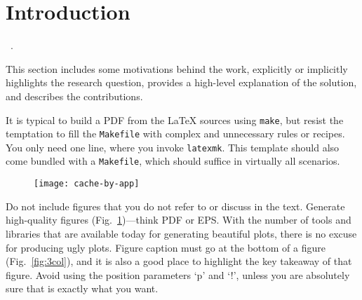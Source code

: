 \section{Introduction}\label{s:intro}

~\cite{Heiser-WebArticle2022}.


This section includes some motivations behind the work, explicitly or implicitly
highlights the research question, provides a high-level explanation of the
solution, and describes the contributions.


%
It is typical to build a PDF from the \LaTeX{} sources using \texttt{make}, but
resist the temptation to fill the \texttt{Makefile} with complex and unnecessary
rules or recipes.
%
You only need one line, where you invoke \texttt{latexmk}.
%
This template should also come bundled with a \texttt{Makefile}, which should
suffice in virtually all scenarios.


\begin{figure}[tbh]
    \texttt{[image: cache-by-app]}
    \label{fig:1col}
\end{figure}

%
Do not include figures that you do not refer to or discuss in the text.
%
Generate high-quality figures (Fig.~\ref{fig:1col})---think PDF or EPS.
%
With the number of tools and libraries that are available today for generating
beautiful plots, there is no excuse for producing ugly plots.
%
Figure caption must go at the bottom of a figure (Fig.~\ref{fig:3col}), and it
is also a good place to highlight the key takeaway of that figure.
%
Avoid using the position parameters `p' and `!', unless you are absolutely sure
that is exactly what you want.

